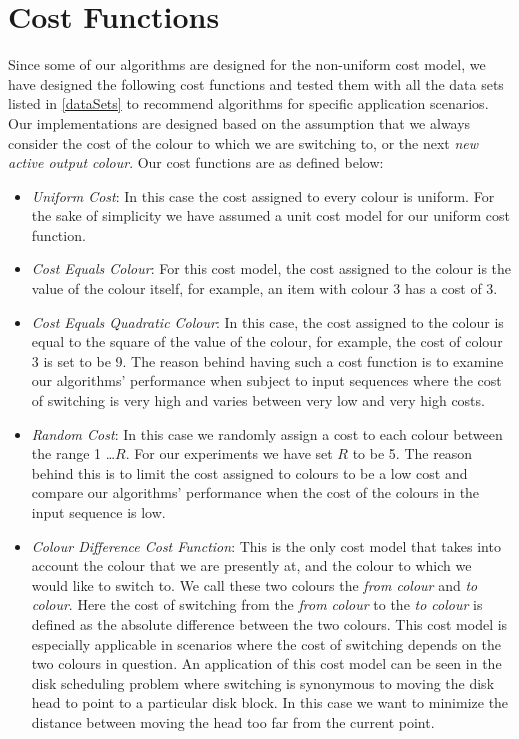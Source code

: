 \section{Cost Functions} \label{costfns}

Since some of our algorithms are designed for the non-uniform cost model, we have designed the following cost functions and tested them with all the data sets listed in \ref{dataSets} to recommend algorithms for specific application scenarios. Our implementations are designed based on the assumption that we always consider the cost of the colour to which we are switching to, or the next \textit{new active output colour}. Our cost functions are as defined below:

\begin{itemize}
\item \textit{Uniform Cost}: In this case the cost assigned to every colour is uniform. For the sake of simplicity we have assumed a unit cost model for our uniform cost function. 
\item \textit{Cost Equals Colour}: For this cost model, the cost assigned to the colour is the value of the colour itself, for example, an item with colour 3 has a cost of 3.
\item \textit{Cost Equals Quadratic Colour}: In this case, the cost assigned to the colour is equal to the square of the value of the colour, for example, the cost of colour 3 is set to be 9. The reason behind having such a cost function is to examine our algorithms' performance when subject to input sequences where the cost of switching is very high and varies between very low and very high costs. 
\item \textit{Random Cost}: In this case we randomly assign a cost to each colour between the range 1 \ldots $R$. For our experiments we have set $R$ to be 5. The reason behind this is to limit the cost assigned to colours to be a low cost and compare our algorithms' performance when the cost of the colours in the input sequence is low.
\item \textit{Colour Difference Cost Function}: This is the only cost model that takes into account the colour that we are presently at, and the colour to which we would like to switch to. We call these two colours the \textit{from colour} and \textit{to colour}.  Here the cost of switching from the \textit{from colour} to the \textit{to colour} is defined as the absolute difference between the two colours. This cost model is especially applicable in scenarios where the cost of switching depends on the two colours in question. An application of this cost model can be seen in the disk scheduling problem where switching is synonymous to moving the disk head to point to a particular disk block. In this case we want to minimize the distance between moving the head too far from the current point. 
\end{itemize}

